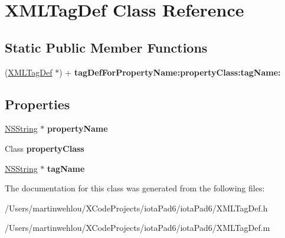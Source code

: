 \hypertarget{interface_x_m_l_tag_def}{
\section{XMLTagDef Class Reference}
\label{interface_x_m_l_tag_def}
}
\subsection*{Static Public Member Functions}
\begin{DoxyCompactItemize}
\item 
\hypertarget{interface_x_m_l_tag_def_a7c758d33308af658d4370b447a981165}{
(\hyperlink{interface_x_m_l_tag_def}{XMLTagDef} $\ast$) + {\bfseries tagDefForPropertyName:propertyClass:tagName:}}
\label{interface_x_m_l_tag_def_a7c758d33308af658d4370b447a981165}

\end{DoxyCompactItemize}
\subsection*{Properties}
\begin{DoxyCompactItemize}
\item 
\hypertarget{interface_x_m_l_tag_def_a5938f6e3df6128814dced2cc9576f75e}{
\hyperlink{class_n_s_string}{NSString} $\ast$ {\bfseries propertyName}}
\label{interface_x_m_l_tag_def_a5938f6e3df6128814dced2cc9576f75e}

\item 
\hypertarget{interface_x_m_l_tag_def_a583d8dc5038cf9a3195839dc95ca1700}{
Class {\bfseries propertyClass}}
\label{interface_x_m_l_tag_def_a583d8dc5038cf9a3195839dc95ca1700}

\item 
\hypertarget{interface_x_m_l_tag_def_a144d7e4dee2a338868e29577e451b006}{
\hyperlink{class_n_s_string}{NSString} $\ast$ {\bfseries tagName}}
\label{interface_x_m_l_tag_def_a144d7e4dee2a338868e29577e451b006}

\end{DoxyCompactItemize}


The documentation for this class was generated from the following files:\begin{DoxyCompactItemize}
\item 
/Users/martinwehlou/XCodeProjects/iotaPad6/iotaPad6/XMLTagDef.h\item 
/Users/martinwehlou/XCodeProjects/iotaPad6/iotaPad6/XMLTagDef.m\end{DoxyCompactItemize}
